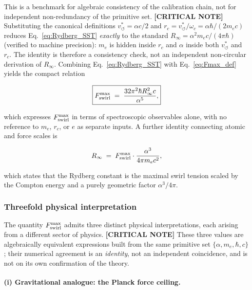 \documentclass[11pt]{article}
\theoremstyle{definition}
\theoremstyle{plain}
\theoremstyle{remark}
\newcommand{\rc}{{r_c}}
\newcommand{\vchar}{v_{\!\boldsymbol{\circlearrowleft}}^{\ast}}
\begin{document}
        This is a benchmark for algebraic consistency of the calibration chain, not for independent non-redundancy of the primitive set. \textbf{[CRITICAL NOTE]} Substituting the canonical definitions $\vchar=\alpha c/2$ and $\rc=\vchar/\omega_c=\alpha\hbar/(2m_ec)$ reduces Eq.~\eqref{eq:Rydberg_SST} \emph{exactly} to the standard $R_\infty=\alpha^2 m_e c/(4\pi\hbar)$ (verified to machine precision): $m_e$ is hidden inside $\rc$ and $\alpha$ inside both $\vchar$ and $\rc$. The identity is therefore a consistency check, not an independent non-circular derivation of $R_\infty$. Combining Eq.~\eqref{eq:Rydberg_SST} with Eq.~\eqref{eq:Fmax_def} yields the compact relation

        \begin{align}
            \boxed{
            F_{\rm swirl}^{\max}
            \;=\; \frac{32\pi^2\hbar R_\infty^2 c}{\alpha^5},
            }
            \label{eq:Fmax_Rydberg}
        \end{align}

        which expresses $F_{\rm swirl}^{\max}$ in terms of spectroscopic observables alone, with no reference to $m_e$, $\rc$, or $e$ as separate inputs. A further identity connecting atomic and force scales is

        \begin{align}
            R_\infty \;=\; F_{\rm swirl}^{\max} \cdot \frac{\alpha^3}{4\pi m_e c^2},
            \label{eq:Rydberg_Fmax}
        \end{align}

        which states that the Rydberg constant is the maximal swirl tension scaled by the Compton energy and a purely geometric factor $\alpha^3/4\pi$.

        \subsubsection{Threefold physical interpretation}

        The quantity $F_{\rm swirl}^{\max}$ admits three distinct physical interpretations, each arising from a different sector of physics. \textbf{[CRITICAL NOTE]} These three values are algebraically equivalent expressions built from the same primitive set $\{\alpha,m_e,\hbar,c\}$; their numerical agreement is an \emph{identity}, not an independent coincidence, and is not on its own confirmation of the theory.

        \paragraph{(i) Gravitational analogue: the Planck force ceiling.}
\end{document}
